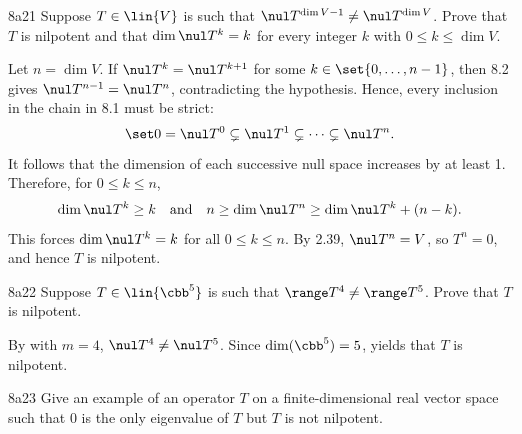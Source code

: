 \begin{exercise}{8a21}
    Suppose $T \in \lin{V}$ is such that $\nul T^{\dim V - 1} \neq \nul T^{\dim V}$.
    Prove that $T$ is nilpotent and that $\dim \nul T^k = k$ for every integer $k$ with $0 \leq k \leq \dim V$.
\end{exercise}

\begin{sol}
    Let $n = \dim V$.
    If $\nul T^k = \nul T^{k+1}$ for some $k \in \set{0, \ldots, n-1}$, then 8.2 gives $\nul T^{n-1} = \nul T^n$, contradicting the hypothesis.
    Hence, every inclusion in the chain in 8.1 must be strict:
    \[
        \set 0 = \nul T^0 \subsetneq \nul T^1 \subsetneq \cdots \subsetneq \nul T^n.
    \]
    It follows that the dimension of each successive null space increases by at least 1.
    Therefore, for $0 \leq k \leq n$,
    \[
        \dim \nul T^k \geq k \quad \text{and} \quad n \geq \dim \nul T^n \geq \dim \nul T^k + (n-k).
    \]
    This forces $\dim \nul T^k = k$ for all $0 \leq k \leq n$.
    By 2.39, $\nul T^n = V$, so $T^n = 0$, and hence $T$ is nilpotent.
\end{sol}

\begin{exercise}{8a22}
    Suppose $T \in \lin{\cbb^5}$ is such that $\range T^4 \neq \range T^5$.
    Prove that $T$ is nilpotent.
\end{exercise}

\begin{sol}
    By  with $m=4$, $\nul T^4 \neq \nul T^5$.
    Since $\dim(\cbb^5) = 5$,  yields that $T$ is nilpotent.
\end{sol}

\begin{exercise}{8a23}
    Give an example of an operator $T$ on a finite-dimensional real vector space such that $0$ is the only eigenvalue of $T$ but $T$ is not nilpotent.

\end{exercise}

